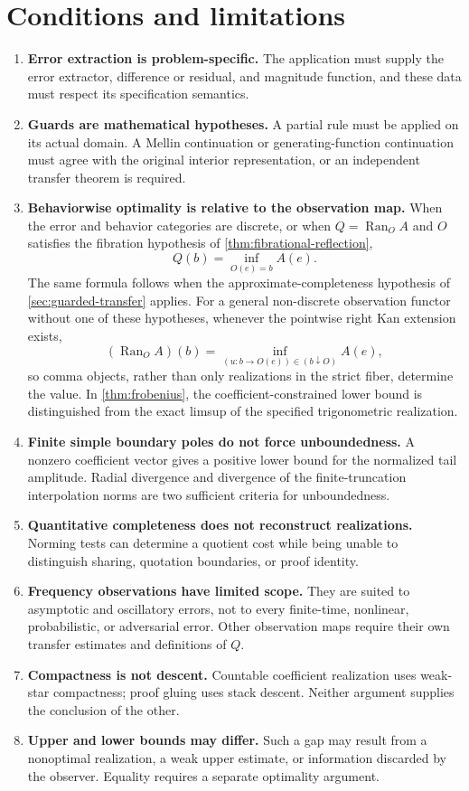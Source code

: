\documentclass[12pt,a4paper,twoside]{extarticle}
\theoremstyle{compactplain}
\theoremstyle{compactdef}
\newcommand{\Ran}{\operatorname{Ran}}
\begin{document}
\section{Conditions and limitations}\label{sec:limitations}
\begin{enumerate}
\item \textbf{Error extraction is problem-specific.}  The application must supply the error extractor, difference or residual, and magnitude function, and these data must respect its specification semantics.
\item \textbf{Guards are mathematical hypotheses.}  A partial rule must be applied on its actual domain.  A Mellin continuation or generating-function continuation must agree with the original interior representation, or an independent transfer theorem is required.
\item \textbf{Behaviorwise optimality is relative to the observation map.}  When the error and behavior categories are discrete, or when $Q=\Ran_OA$ and $O$ satisfies the fibration hypothesis of \cref{thm:fibrational-reflection},
\[
Q(b)=\inf_{O(e)=b}A(e).
\]
The same formula follows when the approximate-completeness hypothesis of \cref{sec:guarded-transfer} applies.  For a general non-discrete observation functor without one of these hypotheses, whenever the pointwise right Kan extension exists,
\[
(\Ran_OA)(b)
=\inf_{(u:b\to O(e))\in(b\downarrow O)}A(e),
\]
so comma objects, rather than only realizations in the strict fiber, determine the value.  In \cref{thm:frobenius}, the coefficient-constrained lower bound is distinguished from the exact limsup of the specified trigonometric realization.
\item \textbf{Finite simple boundary poles do not force unboundedness.}  A nonzero coefficient vector gives a positive lower bound for the normalized tail amplitude.  Radial divergence and divergence of the finite-truncation interpolation norms are two sufficient criteria for unboundedness.
\item \textbf{Quantitative completeness does not reconstruct realizations.}  Norming tests can determine a quotient cost while being unable to distinguish sharing, quotation boundaries, or proof identity.
\item \textbf{Frequency observations have limited scope.}  They are suited to asymptotic and oscillatory errors, not to every finite-time, nonlinear, probabilistic, or adversarial error.  Other observation maps require their own transfer estimates and definitions of $Q$.
\item \textbf{Compactness is not descent.}  Countable coefficient realization uses weak-star compactness; proof gluing uses stack descent.  Neither argument supplies the conclusion of the other.
\item \textbf{Upper and lower bounds may differ.}  Such a gap may result from a nonoptimal realization, a weak upper estimate, or information discarded by the observer.  Equality requires a separate optimality argument.
\end{enumerate}
\end{document}
